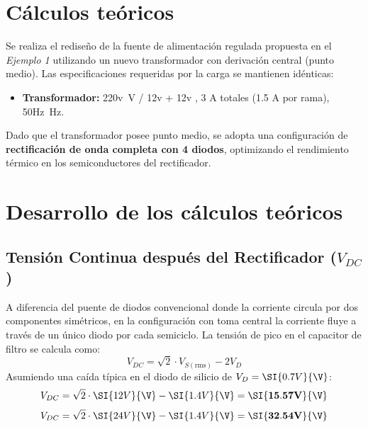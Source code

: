 \documentclass[12pt,a4paper]{article}
\begin{document}
\vspace{0.5cm}

\section{Cálculos teóricos}
Se realiza el rediseño de la fuente de alimentación regulada propuesta en el \textit{Ejemplo 1} utilizando un nuevo transformador con derivación central (punto medio). Las especificaciones requeridas por la carga se mantienen idénticas:
\begin{itemize}
    \item \textbf{Transformador:} \SI{220v}{\V} / {12v}{\V} + {12v}{\V} ,  {3 A}{\A} totales  ({1.5  A}{\A} por rama), \SI{50Hz}{\Hz}.
\end{itemize}

Dado que el transformador posee punto medio, se adopta una configuración de \textbf{rectificación de onda completa con 4 diodos}, optimizando el rendimiento térmico en los semiconductores del rectificador.



\section{Desarrollo de los cálculos teóricos}

\subsection{Tensión Continua después del Rectificador ($V_{DC}$)}
A diferencia del puente de diodos convencional donde la corriente circula por dos componentes simétricos, en la configuración con toma central la corriente fluye a través de un único diodo por cada semiciclo. La tensión de pico en el capacitor de filtro se calcula como:
\begin{equation}
    V_{DC} = \sqrt{2} \cdot V_{S(\text{rms})} - 2 V_D
\end{equation}
Asumiendo una caída típica en el diodo de silicio de $V_D = \SI{0.7V}{\V}$:
\begin{equation}
    V_{DC} = \sqrt{2} \cdot \SI{12V}{\V} - \SI{1.4V}{\V}  = \mathbf{\SI{15.57V}{\V}}
\end{equation}
\begin{equation}
    V_{DC} = \sqrt{2} \cdot \SI{24V}{\V} - \SI{1.4V}{\V}  = \mathbf{\SI{32.54V}{\V}}
\end{equation}
\end{document}
